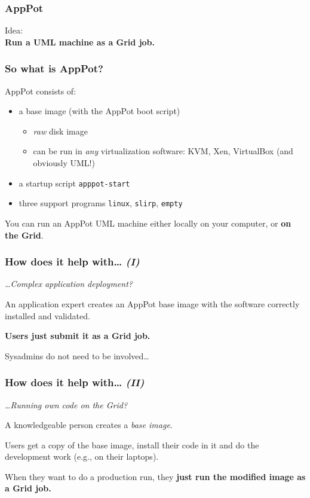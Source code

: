 \documentclass{beamer}
\begin{document}
\begin{frame}
  \frametitle{AppPot}
  \label{sec:8}
  \begin{center}
    \Large
    Idea: 
    \\
    \textbf{Run a UML machine as a Grid job.}
  \end{center}
\end{frame}


\begin{frame}
  \frametitle{So what is AppPot?}
  \label{sec:9}
  AppPot consists of:
  \begin{itemize}
  \item a base image (with the AppPot boot script)
    \begin{itemize}
    \item \emph{raw} disk image
    \item can be run in \emph{any} virtualization software: KVM, Xen,
      VirtualBox (and obviously UML!)
    \end{itemize}
  \item a startup script \texttt{apppot-start}
  \item three support programs \texttt{linux}, \texttt{slirp}, \texttt{empty}
  \end{itemize}

  \+
  You can run an AppPot UML machine either locally on your computer,
  or \textbf{on the Grid}.
\end{frame}


\begin{frame}
  \frametitle{How does it help with\ldots{} \emph{(I)}}
  \label{sec:10}
  
  \emph{\ldots Complex application deployment?}

  \+
  An application expert creates an AppPot base image with the
  software correctly installed and validated.
  
  \+
  \textbf{Users just submit it as a Grid job.}

  \+
  Sysadmins do not need to be involved\ldots
\end{frame}


\begin{frame}
  \frametitle{How does it help with\ldots{} \emph{(II)}}
  \label{sec:11}
  
  \emph{\ldots Running own code on the Grid?}

  \+
  A knowledgeable person creates a \emph{base image}.
  
  \+
  Users get a copy of the base image, install their code in it and do
  the development work (e.g., on their laptops).
  
  \+
  When they want to do a production run, 
  they \textbf{just run the modified image as a Grid job.}
\end{frame}
\end{document}
